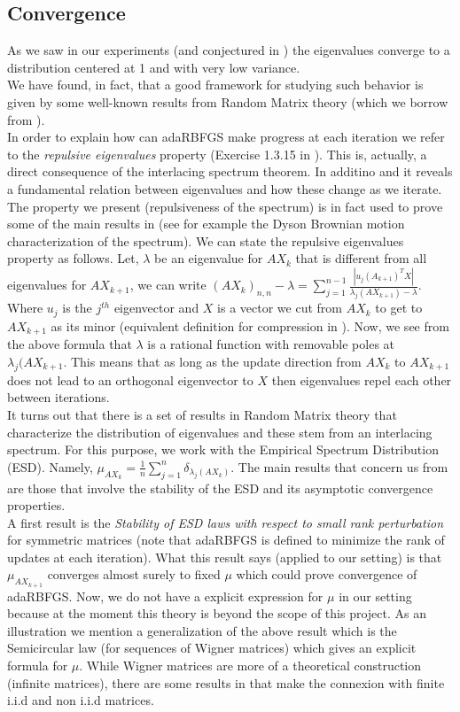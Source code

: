 \documentclass[12pt,conference,compsocconf]{IEEEtran}
\begin{document}
\subsection{Convergence}\label{sect:convergence}
As we saw in our experiments (and conjectured in \cite{Gower1}) the eigenvalues converge to a distribution centered at 1 and with very low variance.\\
We have found, in fact, that a good framework for studying such behavior is given by some well-known results from Random Matrix theory (which we borrow from \cite{Tao}).\\
In order to explain how can adaRBFGS make progress at each iteration we refer to the \textit{repulsive eigenvalues} property (Exercise 1.3.15 in \cite{Tao}). This is, actually, a direct consequence of the interlacing spectrum theorem. In additino and it reveals a fundamental relation between eigenvalues and how these change as we iterate. The property we present (repulsiveness of the spectrum) is in fact used to prove some of the main results in \cite{Tao} (see for example the Dyson Brownian motion characterization of the spectrum). We can state the repulsive eigenvalues property as follows. Let, $\lambda$ be an eigenvalue for $AX_{k}$ that is different from all eigenvalues for $AX_{k+1}$, we can write $(AX_{k})_{n,n}-\lambda = \sum_{j=1}^{n-1}\frac{|u_j(A_{k+1})^TX|}{\lambda_j(AX_{k+1})-\lambda}$. Where $u_j$ is the $j^{th}$ eigenvector and $X$ is a vector we cut from $AX_k$ to get to $AX_{k+1}$ as its minor (equivalent definition for compression in \cite{Horn}). Now, we see from the above formula that $\lambda$ is a rational function with removable poles at $\lambda_j(AX_{k+1}$. This means that as long as the update direction from $AX_k$ to $AX_{k+1}$ does not lead to an orthogonal eigenvector to $X$ then eigenvalues repel each other between iterations.\\
It turns out that there is a set of results in Random Matrix theory that characterize the distribution of eigenvalues and these stem from an interlacing spectrum. For this purpose, we work with the Empirical Spectrum Distribution (ESD). Namely, $\mu_{AX_k} = \frac{1}{n} \sum _{j=1}^{n} \delta_{\lambda_j(AX_k)}$. The main results that concern us from \cite{Tao} are those that involve the stability of the ESD and its asymptotic convergence properties.\\
A first result is the \textit{Stability of ESD laws with respect to small rank perturbation} for symmetric matrices (note that adaRBFGS is defined to minimize the rank of updates at each iteration). What this result says (applied to our setting) is that $\mu_{AX_{k+1}}$ converges almost surely to fixed $\mu$ which could prove convergence of adaRBFGS. Now, we do not have a explicit expression for $\mu$ in our setting because at the moment this theory is beyond the scope of this project. As an illustration we mention a generalization of the above result which is the Semicircular law (for sequences of Wigner matrices) which gives an explicit formula for $\mu$. While Wigner matrices are more of a theoretical construction (infinite matrices), there are some results in \cite{Tao} that make the connexion with finite i.i.d and non i.i.d matrices.\\
\end{document}
